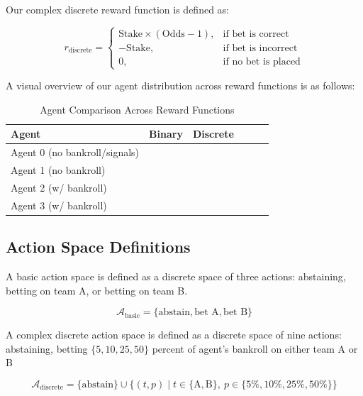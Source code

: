 \documentclass[sigconf]{acmart}
\newcommand{\cmark}{\ding{51}}  %
\begin{document}
Our complex discrete reward function is defined as:

\begin{equation}
r_{\text{discrete}} =
\begin{cases}
\text{Stake} \times (\text{Odds} - 1), & \text{if bet is correct} \\
-\text{Stake}, & \text{if bet is incorrect} \\
\text{0}, & \text{if no bet is placed}
\end{cases}
\end{equation}

A visual overview of our agent distribution across reward functions is as follows:

\begin{table}[h]
  \caption{Agent Comparison Across Reward Functions}
  \label{tab:agent_benchmarks}
  \begin{tabular}{lccccc}
    \toprule
    \textbf{Agent} & \textbf{Binary} & \textbf{Discrete} \\
    \midrule
    Agent 0 (no bankroll/signals)     & \cmark  &        \\
    Agent 1 (no bankroll)     & \cmark  &        \\
    Agent 2 (w/ bankroll)   &         & \cmark \\
    Agent 3 (w/ bankroll)   &         & \cmark \\
    \bottomrule
  \end{tabular}
\end{table}

\subsection{Action Space Definitions}

A basic action space is defined as a discrete space of three actions: abstaining, betting on team A, or betting on team B.

\begin{equation}
\mathcal{A}_{\text{basic}} = \{\text{abstain}, \text{bet A}, \text{bet B} \}
\end{equation}

A complex discrete action space is defined as a discrete space of nine actions: abstaining, betting $\{5, 10, 25, 50\}$ percent of agent's bankroll on either team A or B

\begin{equation}
\mathcal{A}_{\text{discrete}} = \{\text{abstain}\} \cup \{(t, p) \mid t \in \{\text{A}, \text{B}\},\ p \in \{5\%, 10\%, 25\%, 50\%\} \}
\end{equation}
\end{document}
